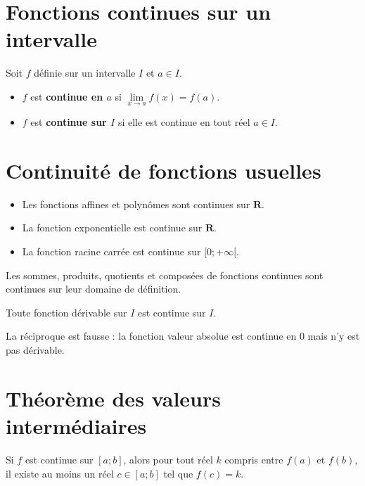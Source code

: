 \documentclass[11pt,a4paper,openany]{book}
\theoremstyle{definition}
\begin{document}
    \section{Fonctions continues sur un intervalle}
    \begin{Définition}
        Soit $f$ définie sur un intervalle $I$ et $a\in I$.
        \begin{itemize}
            \item $f$ est \textbf{continue en $a$} si $\lim\limits_{x\to a}f(x)=f(a)$.
            \item $f$ est \textbf{continue sur $I$} si elle est continue en tout réel $a\in I$.
        \end{itemize}
    \end{Définition}

    \section{Continuité de fonctions usuelles}
    \begin{Propriété}
    \begin{itemize}
        \item Les fonctions affines et polynômes sont continues sur $\mathbf{R}$.
        \item La fonction exponentielle est continue sur $\mathbf{R}$.
        \item La fonction racine carrée est continue sur $[0;+\infty[$.
    \end{itemize}
    \end{Propriété}

    \begin{Propriété}
        Les sommes, produits, quotients et composées de fonctions continues sont continues
        sur leur domaine de définition.
    \end{Propriété}

    \begin{Propriété}
        Toute fonction dérivable sur $I$ est continue sur $I$.
    \end{Propriété}

    \begin{Remarque}
        La réciproque est fausse : la fonction valeur absolue est continue en $0$ mais n'y
        est pas dérivable.
    \end{Remarque}

    \section{Théorème des valeurs intermédiaires}
    \begin{Théorème}
        Si $f$ est continue sur $[a;b]$, alors pour tout réel $k$ compris entre $f(a)$ et
        $f(b)$, il existe au moins un réel $c\in[a;b]$ tel que $f(c)=k$.
    \end{Théorème}
\end{document}

